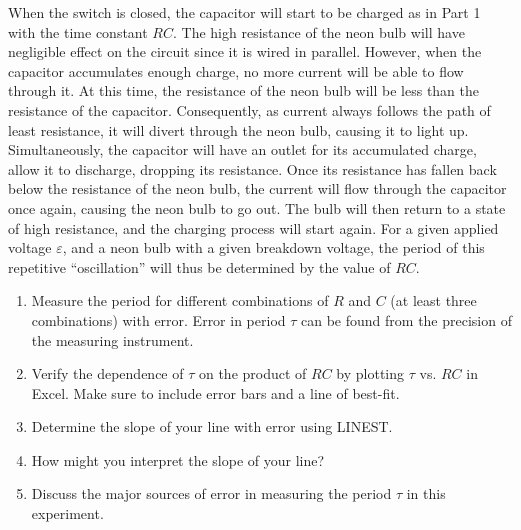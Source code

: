 When the switch is closed, the capacitor will start to be charged as in Part 1 with the time constant $RC$. The high resistance  of the neon bulb will have negligible effect on the circuit since it is wired in parallel. However, when the capacitor accumulates enough charge, no more current will be able to flow through it. At this time, the resistance of the neon bulb will be less than the resistance of the capacitor. Consequently, as current always follows the path of least resistance, it will divert through the neon bulb, causing it to light up. Simultaneously, the capacitor will have an outlet for its accumulated charge, allow it to discharge, dropping its resistance. Once its resistance has fallen back below the resistance of the neon bulb, the current will flow through the capacitor once again, causing the neon bulb to go out. The bulb will then return to a state of high resistance, and the charging process will start again. For a given applied voltage $\varepsilon$, and a neon bulb with a given breakdown voltage, the period of this repetitive ``oscillation'' will thus be determined by the value of $RC$.\myskip
\begin{enumerate}
  \item Measure the period for different combinations of $R$ and $C$ (at least three combinations) with error. Error in period $\tau$ can be found from the precision of the measuring instrument.
  \item Verify the dependence of $\tau$ on the product of $RC$ by plotting $\tau$ vs. $RC$ in Excel. Make sure to include error bars and a line of best-fit.
  \item Determine the slope of your line with error using LINEST.
  \item How might you interpret the slope of your line?
  \item Discuss the major sources of error in measuring the period $\tau$ in this experiment.
\end{enumerate}
